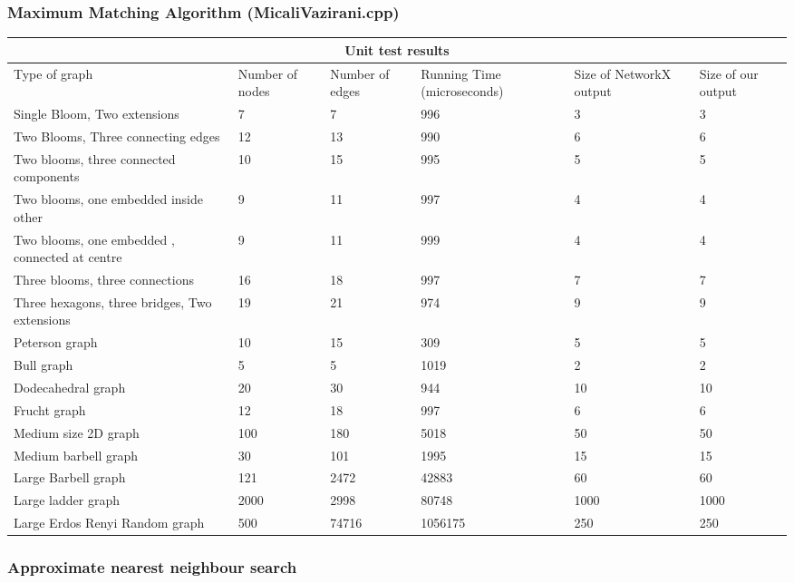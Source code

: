 \documentclass[12pt, a4paper]{article}
\begin{document}
\subsubsection{Maximum Matching Algorithm (MicaliVazirani.cpp)}
{\renewcommand{\arraystretch}{2}
\begin{longtable}{ |p{2cm}||p{2cm}|p{2cm}|p{2cm}|p{2cm}| p{2cm}|  }
 \hline
 \multicolumn{6}{|c|}{Unit test results} \\
 \hline
Type of graph & Number of nodes &Number of edges & Running Time (microseconds) & Size of NetworkX output & Size of our output\\
 \hline
Single Bloom, Two extensions   & 7   &7& 996&3&3  \\\hline
Two Blooms, Three connecting edges   & 12   &13& 990&6&6  \\\hline
Two blooms, three connected components   & 10   &15& 995&5&5  \\\hline
Two blooms, one embedded inside other   & 9   &11& 997&4&4  \\\hline
Two blooms, one embedded , connected at centre &9&11&999&4&4 \\\hline
Three blooms, three connections   & 16   &18& 997&7&7  \\\hline
Three hexagons, three bridges, Two extensions   &19  &21& 974&9&9  \\\hline
Peterson graph & 10  &15& 309&5&5  \\\hline
Bull graph   & 5   &5& 1019&2&2  \\\hline
Dodecahedral graph   &20  &30 & 944 &10&10  \\\hline
Frucht graph   &12   &18 & 997 &6&6  \\\hline
Medium size 2D graph   & 100   &180& 5018&50&50  \\\hline
Medium barbell graph   & 30   &101& 1995&15&15  \\\hline
Large Barbell graph   &121   &2472& 42883&60&60  \\\hline
Large ladder graph   & 2000   &2998& 80748&1000&1000  \\\hline
Large Erdos Renyi Random graph &500 &74716& 1056175&250&250 \\\hline

 \hline
\end{longtable}
\subsubsection{Approximate nearest neighbour search}

}
\end{document}
